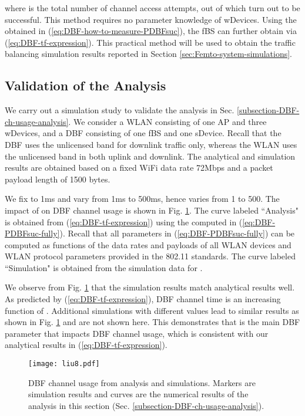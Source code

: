 \documentclass[journal,final,letterpaper,10pt,doublecolumn,twoside]{IEEEtran}
\begin{document}
where  is the total number of channel access
attempts,  out of which  turn out to be successful.  This
method requires no parameter knowledge of wDevices. Using the  obtained in
(\ref{eq:DBF-how-to-measure-PDBFsuc}), the fBS can further obtain
 via (\ref{eq:DBF-tf-expression}). This practical method will
be used to obtain the traffic balancing simulation results reported
in Section \ref{sec:Femto-system-simulations}.


\subsection{Validation of the Analysis}\label{subsection-DBF-sim}

We carry out a simulation study to validate the analysis in Sec.
\ref{subsection-DBF-ch-usage-analysis}. We consider a WLAN
consisting of one AP and three wDevices, and a DBF consisting of one
fBS and one sDevice.  Recall that the DBF uses the unlicensed band for
downlink traffic only, whereas the WLAN uses the unlicensed band in
both uplink and downlink. The analytical and simulation results are
obtained based on a fixed WiFi data rate 72Mbps and a packet payload
length of 1500 bytes.

We fix  to 1ms and vary 
from 1ms to 500ms, hence  varies from 1 to 500. The impact of
 on DBF channel usage  is shown in Fig.
\ref{fig:DBF-sim}. The curve labeled ``Analysis" is obtained from
(\ref{eq:DBF-tf-expression}) using the 
computed in (\ref{eq:DBF-PDBFsuc-fully}). Recall that all parameters
in (\ref{eq:DBF-PDBFsuc-fully}) can be computed as functions of the
data rates and payloads of all WLAN devices and WLAN protocol
parameters provided in the 802.11 standards. The curve labeled
``Simulation" is obtained from the simulation data for .


We observe from  Fig. \ref{fig:DBF-sim} that the simulation results
match analytical results well. As predicted by
(\ref{eq:DBF-tf-expression}), DBF channel time  is an
increasing function of .
Additional simulations with different  values lead to
similar results as shown in Fig.
\ref{fig:DBF-sim} and are not shown here. This demonstrates that
 is the main DBF parameter that impacts DBF channel usage, which is consistent with our analytical results
in (\ref{eq:DBF-tf-expression}).




\begin{figure}
  \center
  \texttt{[image: liu8.pdf]}
  \caption{DBF channel usage  from analysis and simulations.
  Markers are simulation results and curves are the numerical
  results of the analysis in this section (Sec. \ref{subsection-DBF-ch-usage-analysis}). }  \label{fig:DBF-sim}
\end{figure}
\end{document}
